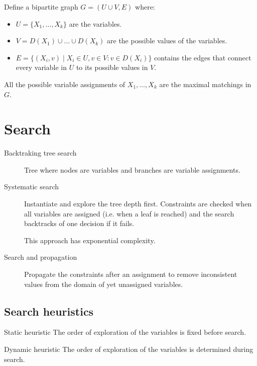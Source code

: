 \begin{descriptionlist}
\begin{example}
            Define a bipartite graph $G=(U \cup V, E)$ where:
            \begin{itemize}
                \item $U = \{ X_1, \dots, X_k \}$ are the variables.
                \item $V = D(X_1) \cup \dots \cup D(X_k)$ are the possible values of the variables.
                \item $E = \{ (X_i, v) \mid X_i \in U, v \in V: v \in D(X_i) \}$ 
                    contains the edges that connect every variable in $U$ to its possible values in $V$.
            \end{itemize} 

            All the possible variable assignments of $X_1, \dots, X_k$ are the maximal matchings in $G$.
        \end{example}
\end{descriptionlist}



\section{Search}


\begin{description}
    \item[Backtraking tree search] 
        Tree where nodes are variables and branches are variable assignments.

    \item[Systematic search] 
        Instantiate and explore the tree depth first.
        Constraints are checked when all variables are assigned (i.e. when a leaf is reached)
        and the search backtracks of one decision if it fails.

        This approach has exponential complexity.

    \item[Search and propagation] 
        Propagate the constraints after an assignment to 
        remove inconsistent values from the domain of yet unassigned variables.
\end{description}


\subsection{Search heuristics}

\begin{descriptionlist}
    \item[Static heuristic] 
        The order of exploration of the variables is fixed before search.

    \item[Dynamic heuristic]  
        The order of exploration of the variables is determined during search.
\end{descriptionlist}


